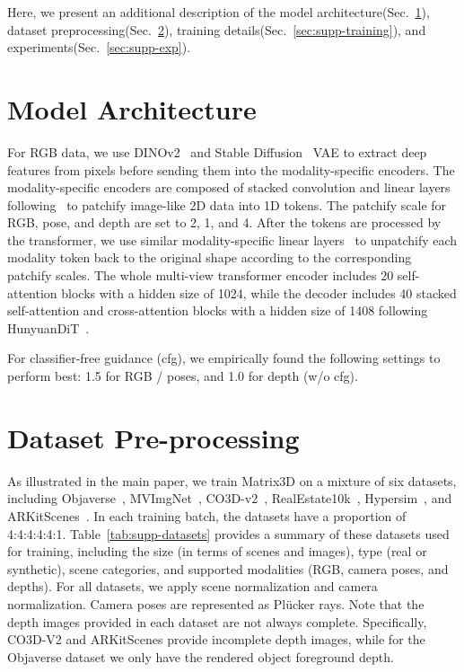 \clearpage
\setcounter{page}{1}
\maketitlesupplementary
Here, we present an additional description of the model architecture(Sec.~\ref{sec:supp-arch}), dataset preprocessing(Sec.~\ref{sec:supp-dataset}), training details(Sec.~\ref{sec:supp-training}), and experiments(Sec.~\ref{sec:supp-exp}).

\section{Model Architecture}
\label{sec:supp-arch}
For RGB data, we use DINOv2~\cite{oquab2023dinov2} and Stable Diffusion~\cite{rombach2021highresolution} VAE to extract deep features from pixels before sending them into the modality-specific encoders. The modality-specific encoders are composed of stacked convolution and linear layers following~\cite{peebles2023scalable} to patchify image-like 2D data into 1D tokens. The patchify scale for RGB, pose, and depth are set to 2, 1, and 4. After the tokens are processed by the transformer, we use similar modality-specific linear layers~\cite{peebles2023scalable} to unpatchify each modality token back to the original shape according to the corresponding patchify scales. The whole multi-view transformer encoder includes 20 self-attention blocks with a hidden size of 1024, while the decoder includes 40 stacked self-attention and cross-attention blocks with a hidden size of 1408 following HunyuanDiT~\cite{li2024hunyuan}. 

For classifier-free guidance (cfg), we empirically found the following settings to perform best: 1.5 for RGB / poses, and 1.0 for depth (w/o cfg).


\section{Dataset Pre-processing}
\label{sec:supp-dataset}
As illustrated in the main paper, we train Matrix3D on a mixture of six datasets, including Objaverse~\cite{deitke2023objaverse}, MVImgNet~\cite{yu2023mvimgnet}, CO3D-v2~\cite{reizenstein21co3d}, RealEstate10k~\cite{zhou2018stereo}, Hypersim~\cite{roberts2021hypersim}, and ARKitScenes~\cite{baruch2021arkitscenes}. In each training batch, the datasets have a proportion of 4:4:4:4:4:1. Table~\ref{tab:supp-datasets} provides a summary of these datasets used for training, including the size (in terms of scenes and images), type (real or synthetic), scene categories, and supported modalities (RGB, camera poses, and depths). For all datasets, we apply scene normalization and camera normalization. Camera poses are represented as Pl\"ucker rays. Note that the depth images provided in each dataset are not always complete. Specifically, CO3D-V2 and ARKitScenes provide incomplete depth images, while for the Objaverse dataset we only have the rendered object foreground depth.

